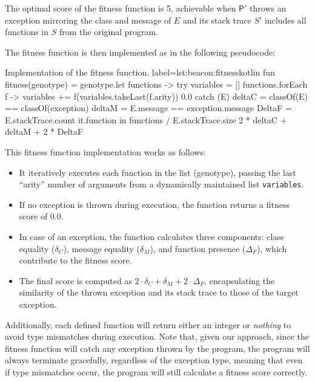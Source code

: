        The optimal score of the fitness function is 5, achievable when \(\mathsf{P'}\) throws an exception mirroring 
        the class and message of \(E\) and its stack trace \(S'\) includes all functions in \(S\) from the original 
        program.
    
        The fitness function is then implemented as in the following pseudocode:

        \begin{code}{%
            Implementation of the fitness function.
        }{label=lst:beacon:fitness}{kotlin}
            fun fitness(genotype) = genotype.let { functions ->
                try {
                    variables = []
                    functions.forEach { f ->
                        variables += f(variables.takeLast(f.arity))
                    }
                    0.0
                } catch (E) {
                    deltaC = classOf(E) == classOf(exception)
                    deltaM = E.message == exception.message
                    DeltaF = E.stackTrace.count { it.function in functions } / E.stackTrace.size
                    2 * deltaC + deltaM + 2 * DeltaF
                }
            }
        \end{code}

        This fitness function implementation works as follows: 
        \begin{itemize}
            \item It iteratively executes each function in the list (genotype), passing the last \enquote{arity} number 
                of arguments from a dynamically maintained list \texttt{variables}. 
            \item If no exception is thrown during execution, the function returns a fitness score of 0.0.
            \item In case of an exception, the function calculates three components: class equality (\(\delta_C\)), 
                message equality (\(\delta_M\)), and function presence (\(\Delta_F\)), which contribute to the fitness 
                score.
            \item The final score is computed as \(2 \cdot \delta_C + \delta_M + 2 \cdot \Delta_F\), encapsulating the 
                similarity of the thrown exception and its stack trace to those of the target exception.
        \end{itemize}
        
        Additionally, each defined function will return either an integer or \textit{nothing} to avoid type mismatches
        during execution. Note that, given our approach, since the fitness function will catch any exception thrown by
        the program, the program will always terminate gracefully, regardless of the exception type, meaning that even
        if type mismatches occur, the program will still calculate a fitness score correctly.

